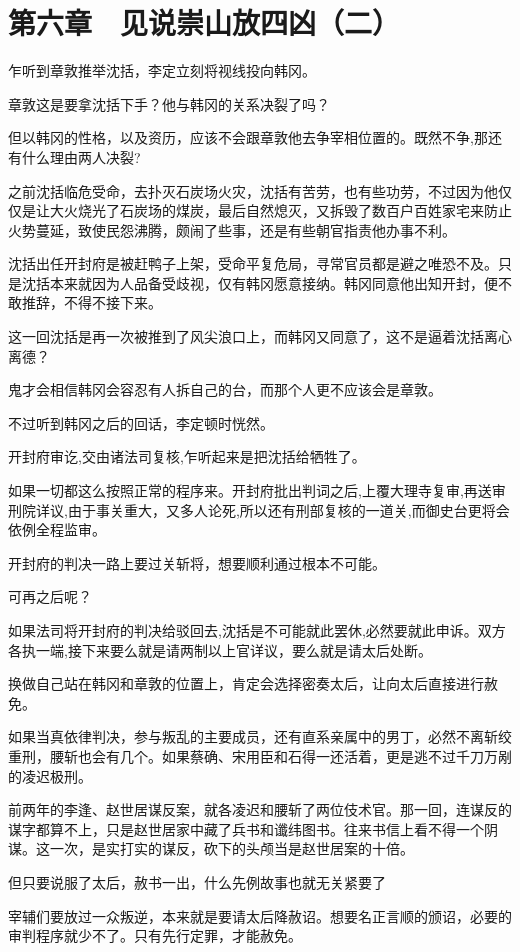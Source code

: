 \section{第六章　见说崇山放四凶（二）}

乍听到章敦推举沈括，李定立刻将视线投向韩冈。

章敦这是要拿沈括下手？他与韩冈的关系决裂了吗？

但以韩冈的性格，以及资历，应该不会跟章敦他去争宰相位置的。既然不争,那还有什么理由两人决裂?

之前沈括临危受命，去扑灭石炭场火灾，沈括有苦劳，也有些功劳，不过因为他仅仅是让大火烧光了石炭场的煤炭，最后自然熄灭，又拆毁了数百户百姓家宅来防止火势蔓延，致使民怨沸腾，颇闹了些事，还是有些朝官指责他办事不利。

沈括出任开封府是被赶鸭子上架，受命平复危局，寻常官员都是避之唯恐不及。只是沈括本来就因为人品备受歧视，仅有韩冈愿意接纳。韩冈同意他出知开封，便不敢推辞，不得不接下来。

这一回沈括是再一次被推到了风尖浪口上，而韩冈又同意了，这不是逼着沈括离心离德？

鬼才会相信韩冈会容忍有人拆自己的台，而那个人更不应该会是章敦。

不过听到韩冈之后的回话，李定顿时恍然。

开封府审讫,交由诸法司复核,乍听起来是把沈括给牺牲了。

如果一切都这么按照正常的程序来。开封府批出判词之后,上覆大理寺复审,再送审刑院详议,由于事关重大，又多人论死,所以还有刑部复核的一道关,而御史台更将会依例全程监审。

开封府的判决一路上要过关斩将，想要顺利通过根本不可能。

可再之后呢？

如果法司将开封府的判决给驳回去,沈括是不可能就此罢休,必然要就此申诉。双方各执一端,接下来要么就是请两制以上官详议，要么就是请太后处断。

换做自己站在韩冈和章敦的位置上，肯定会选择密奏太后，让向太后直接进行赦免。

如果当真依律判决，参与叛乱的主要成员，还有直系亲属中的男丁，必然不离斩绞重刑，腰斩也会有几个。如果蔡确、宋用臣和石得一还活着，更是逃不过千刀万剐的凌迟极刑。

前两年的李逢、赵世居谋反案，就各凌迟和腰斩了两位伎术官。那一回，连谋反的谋字都算不上，只是赵世居家中藏了兵书和谶纬图书。往来书信上看不得一个阴谋。这一次，是实打实的谋反，砍下的头颅当是赵世居案的十倍。

但只要说服了太后，赦书一出，什么先例故事也就无关紧要了

宰辅们要放过一众叛逆，本来就是要请太后降赦诏。想要名正言顺的颁诏，必要的审判程序就少不了。只有先行定罪，才能赦免。

